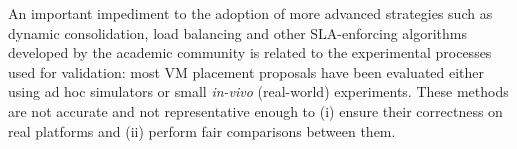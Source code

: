 An important impediment to the adoption of more advanced strategies
such as dynamic consolidation, load balancing and other SLA-enforcing
algorithms developed by the academic community
\cite{feller:ccgrid12,Hermenier:2009:ECM:1508293.1508300,quesnel:cpe2012,5328077,5935254}
is related to the experimental processes used for validation: most VM
placement proposals have been evaluated either using ad hoc simulators
or small \textit {in-vivo} (\ie real-world) experiments. These methods
are not accurate and not representative enough to (i) ensure their
correctness on real platforms and (ii) perform fair comparisons
between them.
%
